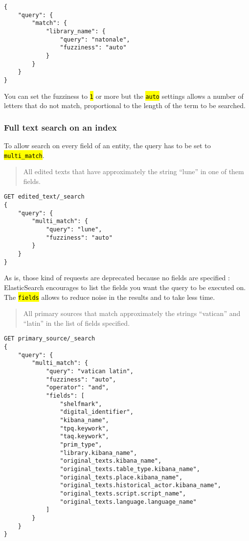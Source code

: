 \documentclass[a4paper,12pt]{article}
\let\OldTexttt\texttt
\renewcommand{\texttt}[1]{\OldTexttt{\hl{#1}}}
\begin{document}
\begin{lstlisting}
{
    "query": {
        "match": {
            "library_name": {
                "query": "natonale",
                "fuzziness": "auto"
            }
        }
    }
}
\end{lstlisting}

You can set the fuzziness to \texttt{1} or more but the \texttt{auto} settings allows a number of letters that do not match, proportional to the length of the term to be searched.

\subsubsection{Full text search on an index}\label{full-text-search-on-an-index}

To allow search on every field of an entity, the query has to be set to \texttt{multi\_match}.

\begin{quote}
All edited texts that have approximately the string ``lune'' in one of them fields.
\end{quote}

\begin{lstlisting}
GET edited_text/_search
{
    "query": {
        "multi_match": {
            "query": "lune",
            "fuzziness": "auto"
        }
    }
}
\end{lstlisting}

As is, those kind of requests are deprecated because no fields are specified : ElasticSearch encourages to list the fields you want the query to be executed on. The \texttt{fields} allows to reduce noise in the results and to take less time.

\begin{quote}
All primary sources that match approximately the strings ``vatican'' and ``latin'' in the list of fields specified.
\end{quote}

\begin{lstlisting}
GET primary_source/_search
{
    "query": {
        "multi_match": {
            "query": "vatican latin",
            "fuzziness": "auto",
            "operator": "and",
            "fields": [
                "shelfmark",
                "digital_identifier",
                "kibana_name",
                "tpq.keywork",
                "taq.keywork",
                "prim_type",
                "library.kibana_name",
                "original_texts.kibana_name",
                "original_texts.table_type.kibana_name",
                "original_texts.place.kibana_name",
                "original_texts.historical_actor.kibana_name",
                "original_texts.script.script_name",
                "original_texts.language.language_name"
            ]
        }
    }
}
\end{lstlisting}
\end{document}
